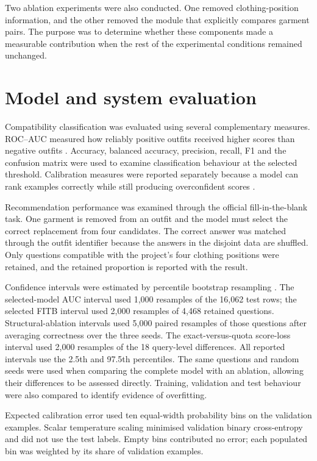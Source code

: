 Two ablation experiments were also conducted. One removed clothing-position
information, and the other removed the module that explicitly compares garment
pairs. The purpose was to determine whether these components made a measurable
contribution when the rest of the experimental conditions remained unchanged.

\section{Model and system evaluation}

Compatibility classification was evaluated using several complementary
measures. ROC--AUC measured how reliably positive outfits received higher
scores than negative outfits \parencite{fawcett2006roc}. Accuracy, balanced
accuracy, precision, recall, F1 and the confusion matrix were used to examine
classification behaviour at the selected threshold. Calibration measures were
reported separately because a model can rank examples correctly while still
producing overconfident scores \parencite{guo2017calibration}.

Recommendation performance was examined through the official fill-in-the-blank
task. One garment is removed from an outfit and the model must select the
correct replacement from four candidates. The correct answer was matched
through the outfit identifier because the answers in the disjoint data are
shuffled. Only questions compatible with the project's four clothing positions
were retained, and the retained proportion is reported with the result.

Confidence intervals were estimated by percentile bootstrap resampling
\parencite{efron1994bootstrap}. The selected-model AUC interval used 1,000
resamples of the 16,062 test rows; the selected FITB interval used 2,000
resamples of 4,468 retained questions. Structural-ablation intervals used
5,000 paired resamples of those questions after averaging correctness over the
three seeds. The exact-versus-quota score-loss interval used 2,000 resamples of
the 18 query-level differences. All reported intervals use the 2.5th and
97.5th percentiles. The same questions and random seeds
were used when comparing the complete model with an ablation, allowing their
differences to be assessed directly. Training, validation and test behaviour
were also compared to identify evidence of overfitting.

Expected calibration error used ten equal-width probability bins on the
validation examples. Scalar temperature scaling minimised validation binary
cross-entropy and did not use the test labels. Empty bins contributed no error;
each populated bin was weighted by its share of validation examples.

